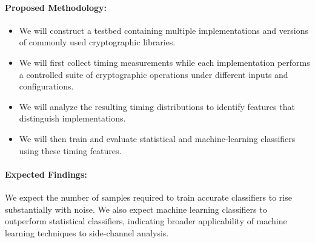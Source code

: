 \documentclass{article}
\begin{document}
\paragraph{Proposed Methodology:} 
\begin{itemize}
    \item We will construct a testbed containing multiple implementations and versions of commonly used cryptographic libraries. 
    \item We will first collect timing measurements while each implementation performs a controlled suite of cryptographic operations under different inputs and configurations. 
    \item We will analyze the resulting timing distributions to identify features that distinguish implementations.
    \item We will then train and evaluate statistical and machine-learning classifiers using these timing features.
\end{itemize}

\paragraph{Expected Findings:} We expect the number of samples 
required to train accurate classifiers to rise substantially with noise. We also expect machine learning classifiers to outperform statistical classifiers, indicating broader applicability of machine learning techniques to side-channel analysis.   
\end{document}
